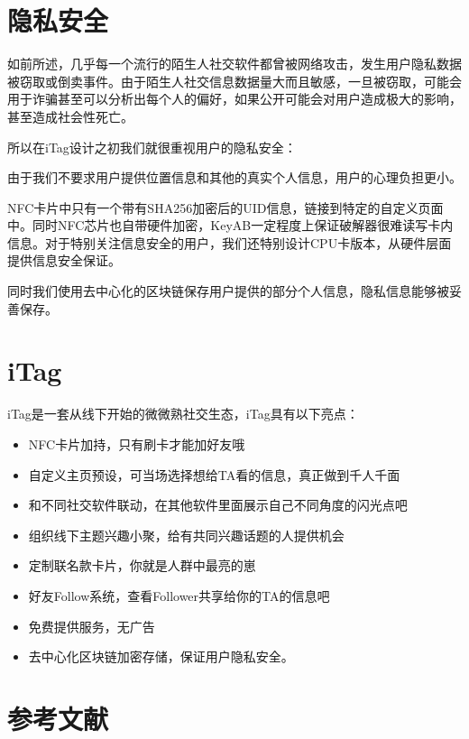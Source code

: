 \documentclass[UTF8]{ctexart}
\begin{document}
\section{隐私安全}

如前所述，几乎每一个流行的陌生人社交软件都曾被网络攻击，发生用户隐私数据被窃取或倒卖事件。由于陌生人社交信息数据量大而且敏感，一旦被窃取，可能会用于诈骗甚至可以分析出每个人的偏好，如果公开可能会对用户造成极大的影响，甚至造成社会性死亡。

所以在iTag设计之初我们就很重视用户的隐私安全：

由于我们不要求用户提供位置信息和其他的真实个人信息，用户的心理负担更小。

NFC卡片中只有一个带有SHA256加密后的UID信息，链接到特定的自定义页面中。同时NFC芯片也自带硬件加密，KeyAB一定程度上保证破解器很难读写卡内信息。对于特别关注信息安全的用户，我们还特别设计CPU卡版本，从硬件层面提供信息安全保证。

同时我们使用去中心化的区块链保存用户提供的部分个人信息，隐私信息能够被妥善保存。

\section{iTag}
iTag是一套从线下开始的微微熟社交生态，iTag具有以下亮点：

\begin{itemize}
    \item NFC卡片加持，只有刷卡才能加好友哦
    \item 自定义主页预设，可当场选择想给TA看的信息，真正做到千人千面
    \item 和不同社交软件联动，在其他软件里面展示自己不同角度的闪光点吧
    \item 组织线下主题兴趣小聚，给有共同兴趣话题的人提供机会
    \item 定制联名款卡片，你就是人群中最亮的崽
    \item 好友Follow系统，查看Follower共享给你的TA的信息吧~
    \item 免费提供服务，无广告
    \item 去中心化区块链加密存储，保证用户隐私安全。
\end{itemize}

\section{参考文献}



\end{document}
